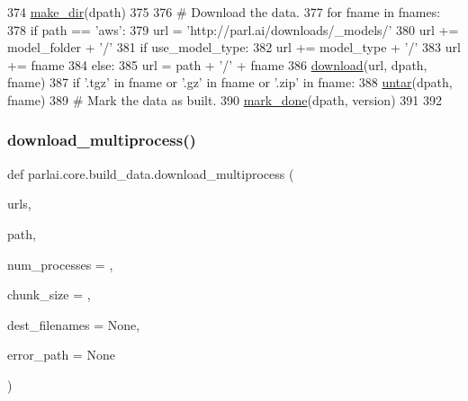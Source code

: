 \begin{DoxyCode}
374         \hyperlink{namespaceparlai_1_1core_1_1build__data_a6ce042fedd4194bd016845bbe7a8facf}{make\_dir}(dpath)
375 
376         \textcolor{comment}{# Download the data.}
377         \textcolor{keywordflow}{for} fname \textcolor{keywordflow}{in} fnames:
378             \textcolor{keywordflow}{if} path == \textcolor{stringliteral}{'aws'}:
379                 url = \textcolor{stringliteral}{'http://parl.ai/downloads/\_models/'}
380                 url += model\_folder + \textcolor{stringliteral}{'/'}
381                 \textcolor{keywordflow}{if} use\_model\_type:
382                     url += model\_type + \textcolor{stringliteral}{'/'}
383                 url += fname
384             \textcolor{keywordflow}{else}:
385                 url = path + \textcolor{stringliteral}{'/'} + fname
386             \hyperlink{namespaceparlai_1_1core_1_1build__data_ab74f0e428f05e5d91fa93c8afb367622}{download}(url, dpath, fname)
387             \textcolor{keywordflow}{if} \textcolor{stringliteral}{'.tgz'} \textcolor{keywordflow}{in} fname \textcolor{keywordflow}{or} \textcolor{stringliteral}{'.gz'} \textcolor{keywordflow}{in} fname \textcolor{keywordflow}{or} \textcolor{stringliteral}{'.zip'} \textcolor{keywordflow}{in} fname:
388                 \hyperlink{namespaceparlai_1_1core_1_1build__data_a4d33f97932682a8513904022d852f3cf}{untar}(dpath, fname)
389         \textcolor{comment}{# Mark the data as built.}
390         \hyperlink{namespaceparlai_1_1core_1_1build__data_a2527e6d29b0ccb7b841182890ac36a59}{mark\_done}(dpath, version)
391 
392 
\end{DoxyCode}
\mbox{\label{namespaceparlai_1_1core_1_1build__data_ae259aeb321a77560fbcd23028178c897}} 
\subsubsection{\texorpdfstring{download\+\_\+multiprocess()}{download\_multiprocess()}}
{\footnotesize\ttfamily def parlai.\+core.\+build\+\_\+data.\+download\+\_\+multiprocess (\begin{DoxyParamCaption}\item[{}]{urls,  }\item[{}]{path,  }\item[{}]{num\+\_\+processes = {},  }\item[{}]{chunk\+\_\+size = {},  }\item[{}]{dest\+\_\+filenames = {\ttfamily None},  }\item[{}]{error\+\_\+path = {\ttfamily None} }\end{DoxyParamCaption})}

